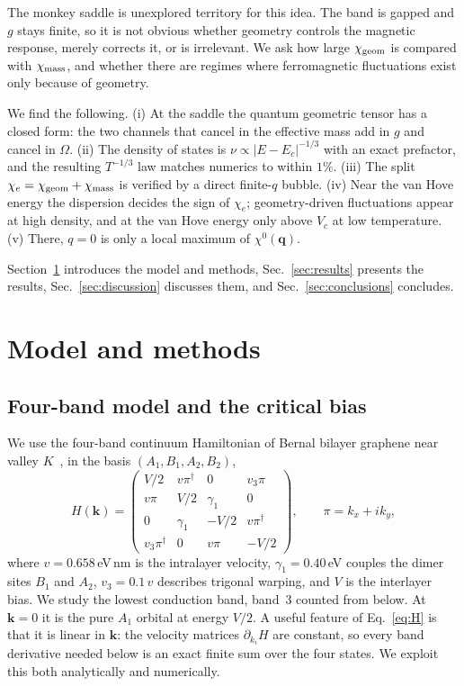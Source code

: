 \documentclass[12pt,a4paper]{article}
\newcommand{\bk}{\mathbf{k}}
\newcommand{\bq}{\mathbf{q}}
\newcommand{\chie}{\chi_{e}}
\newcommand{\chig}{\chi_{\rm geom}}
\newcommand{\chim}{\chi_{\rm mass}}
\begin{document}
The monkey saddle is unexplored territory for this idea. The band is gapped and $g$ stays finite, so it is not obvious whether geometry controls the magnetic response, merely corrects it, or is irrelevant. We ask how large $\chig$ is compared with $\chim$, and whether there are regimes where ferromagnetic fluctuations exist only because of geometry.

We find the following. (i) At the saddle the quantum geometric tensor has a closed form: the two channels that cancel in the effective mass add in $g$ and cancel in $\Omega$. (ii) The density of states is $\nu\propto|E-E_c|^{-1/3}$ with an exact prefactor, and the resulting $T^{-1/3}$ law matches numerics to within $1\%$. (iii) The split $\chie=\chig+\chim$ is verified by a direct finite-$q$ bubble. (iv) Near the van Hove energy the dispersion decides the sign of $\chie$; geometry-driven fluctuations appear at high density, and at the van Hove energy only above $V_c$ at low temperature. (v) There, $q=0$ is only a local maximum of $\chi^0(\bq)$.

Section~\ref{sec:methods} introduces the model and methods, Sec.~\ref{sec:results} presents the results, Sec.~\ref{sec:discussion} discusses them, and Sec.~\ref{sec:conclusions} concludes.
\section{Model and methods}\label{sec:methods}

\subsection{Four-band model and the critical bias}\label{sec:model}

We use the four-band continuum Hamiltonian of Bernal bilayer graphene near valley $K$~\citep{McCann2006,McCann2013}, in the basis $(A_1,B_1,A_2,B_2)$,
\begin{equation}
H(\bk)=\begin{pmatrix}
V/2 & v\pi^\dagger & 0 & v_3\pi\\
v\pi & V/2 & \gamma_1 & 0\\
0 & \gamma_1 & -V/2 & v\pi^\dagger\\
v_3\pi^\dagger & 0 & v\pi & -V/2
\end{pmatrix},\qquad \pi=k_x+ik_y,
\label{eq:H}
\end{equation}
where $v=0.658\,$eV\,nm is the intralayer velocity, $\gamma_1=0.40\,$eV couples the dimer sites $B_1$ and $A_2$, $v_3=0.1\,v$ describes trigonal warping, and $V$ is the interlayer bias. We study the lowest conduction band, band~3 counted from below. At $\bk=0$ it is the pure $A_1$ orbital at energy $V/2$. A useful feature of Eq.~\eqref{eq:H} is that it is linear in $\bk$: the velocity matrices $\partial_{k_i}H$ are constant, so every band derivative needed below is an exact finite sum over the four states. We exploit this both analytically and numerically.
\end{document}
